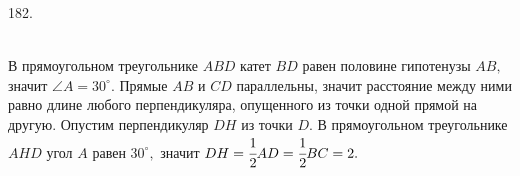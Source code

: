 182. \begin{figure}[ht!]
\end{figure}\\
В прямоугольном треугольнике $ABD$ катет $BD$ равен половине гипотенузы $AB,$ значит $\angle A=30^\circ.$ Прямые $AB$ и $CD$ параллельны, значит расстояние между ними равно длине любого перпендикуляра, опущенного из точки одной прямой на другую. Опустим перпендикуляр $DH$ из точки $D.$ В прямоугольном треугольнике $AHD$ угол $A$ равен $30^\circ,$ значит $DH=\cfrac{1}{2}AD=\cfrac{1}{2}BC=2.$\newpage\noindent
